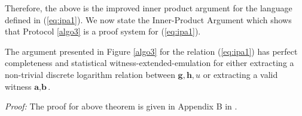 Therefore, the above is the improved inner product argument for the language defined in (\ref{eq:ipa1}).
We now state the Inner-Product Argument which shows that Protocol \ref{algo3} is a proof system for (\ref{eq:ipa1}).

\begin{theorem}
    The argument presented in Figure \ref{algo3} for the relation (\ref{eq:ipa1}) has perfect completeness and statistical witness-extended-emulation for either extracting a non-trivial discrete logarithm relation between $\textbf{g}, \textbf{h}, u$ or extracting a valid witness $\textbf{a}, \textbf{b}$.
\end{theorem}
\textit{Proof:} The proof for above theorem is given in Appendix B in \cite{Bunz2018}.
